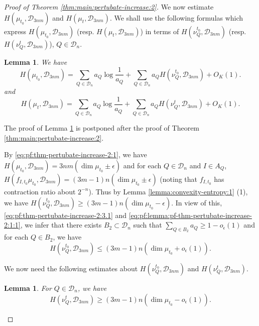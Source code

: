 \documentclass[a4paper,11pt]{amsart}
\newtheorem{lemma}[theorem]{Lemma}
\theoremstyle{definition}
\numberwithin{equation}{section}
\def\D{\mathcal{D}}
\begin{document}
\begin{proof}[Proof of Theorem  \ref{thm:main:pertubate-increase:2}]
We now estimate $H(\mu_{t_0},\D_{3nm})$ and $H(\mu_{t},\D_{3nm})$.  We shall use the following formulas which express $H(\mu_{t_0},\D_{3nm})$ (resp. $H(\mu_{t},\D_{3nm})$) in terms of $H(\nu_Q^{t_0},  \D_{3nm})$ (resp.  $H(\nu_Q^{t},  \D_{3nm})$),   $Q\in \D_n$.
\begin{lemma}\label{lemma:pf-thm-pertubate-increase-2:1}
We have
\begin{equation}\label{eq:pf:lemma:pf-thm-pertubate-increase-2:1:1}
H(\mu_{t_0},\D_{3nm}) = \sum_{Q\in \D_n}a_Q\log \frac{1}{a_Q}  +  \sum_{Q\in \D_n}a_Q H(\nu_Q^{t_0},  \D_{3nm}) +O_K(1).  
\end{equation}
and
\begin{equation}\label{eq:pf:lemma:pf-thm-pertubate-increase-2:1:2}
H(\mu_{t},\D_{3nm}) = \sum_{Q\in \D_n}a_Q\log \frac{1}{a_Q}  +  \sum_{Q\in \D_n}a_Q H(\nu_Q^{t},  \D_{3nm}) +O_K(1). 
\end{equation}
\end{lemma}
The proof of Lemma \ref{lemma:pf-thm-pertubate-increase-2:1} is postponed after the proof of Theorem \ref{thm:main:pertubate-increase:2}.  

By \eqref{eq:pf:thm-pertubate-increase-2:1}, we have $H(\mu_{t_0},\D_{3nm}) = 3nm (\dim \mu_{t_0}\pm \epsilon)$ and for each $Q\in \D_n$ and $I\in A_Q$,   $H(f_{I,t_0}\mu_{t_0},\D_{3nm}) = (3m-1)n (\dim \mu_{t_0}\pm \epsilon)$ (noting that $f_{I,t_0}$ has contraction ratio about $2^{-n}$). Thus by Lemma \ref{lemma:convexity-entropy:1} (1),  we have $H(\nu_Q^{t_0},  \D_{3nm}) \ge (3m-1)n (\dim \mu_{t_0} -  \epsilon)$.  In view of this,   \eqref{eq:pf:thm-pertubate-increase-2:3.1} and \eqref{eq:pf:lemma:pf-thm-pertubate-increase-2:1:1},  we infer that there exists $B_2\subset \D_n$ such that $\sum_{Q\in B_2}a_Q\ge 1-o_{\epsilon}(1)$ and for each $Q\in B_2$,  we have 
\begin{equation}\label{eq:pf:thm-pertubate-increase-2:7}
H(\nu_Q^{t_0},  \D_{3nm}) \le  (3m-1)n (\dim \mu_{t_0} +o_\epsilon(1)).
\end{equation}

We now need the following estimates about $H(\nu_Q^{t_0},  \D_{3nm}) $ and $H(\nu_Q^{t},  \D_{3nm}) $.  
\begin{lemma}\label{lemma:pf-thm-pertubate-increase-2:2}
For $Q\in \D_n$,  we have
\begin{equation}\label{eq:pf:lemma:pf-thm-pertubate-increase-2:2:1}
H(\nu_Q^{t},  \D_{3nm}) \ge  (3m-1)n (\dim \mu_{t_0}-o_\epsilon(1)).
\end{equation}
\end{lemma}


\end{proof}
\end{document}
